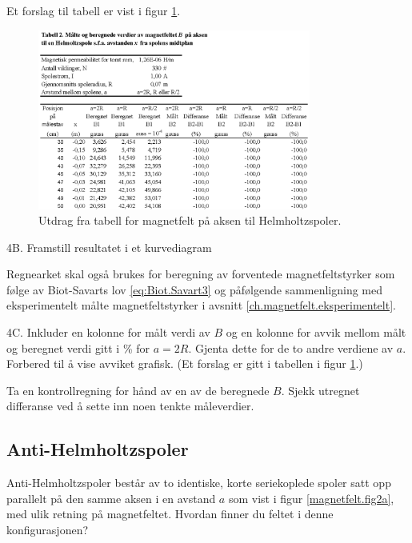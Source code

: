 \documentclass[../Elmag-labhefte-2020.tex]{subfiles}
\begin{document}
Et forslag til tabell er vist i figur \ref{magnetfelt.tab2}. 

\begin{figure}[!ht]
    \begin{center}
    \includegraphics[width=0.8\textwidth]{fig/magnetfelt-tab2.eps}
    \end{center}
    \caption{%
        Utdrag fra tabell for magnetfelt på aksen til Helmholtzspoler.
    }
    \label{magnetfelt.tab2}
\end{figure}

{\itsf 4B. Framstill resultatet i et kurvediagram}

Regnearket skal også brukes for beregning av forventede magnetfeltstyrker som følge av Biot-Savarts lov \eqref{eq:Biot.Savart3}  og påfølgende sammenligning med eksperimentelt målte magnetfeltstyrker i avsnitt \ref{ch.magnetfelt.eksperimentelt}.

{\itsf 4C. Inkluder en kolonne for målt verdi av $B$ og en kolonne for avvik mellom målt og beregnet verdi gitt i \si{\percent} for $a = 2R$. Gjenta dette for de to andre verdiene av $a$. Forbered til å vise avviket grafisk.} (Et forslag er gitt i tabellen i figur \ref{magnetfelt.tab2}.)

Ta en kontrollregning for hånd av en av de beregnede $B$. Sjekk utregnet differanse ved å sette inn noen tenkte måleverdier.

\subsection{Anti-Helmholtzspoler}

Anti-Helmholtzspoler består av to identiske, korte seriekoplede spoler satt opp parallelt på den samme aksen i en avstand $a$ som vist i figur \ref{magnetfelt.fig2a}, med ulik retning på magnetfeltet. Hvordan finner du feltet i denne konfigurasjonen?
\end{document}
